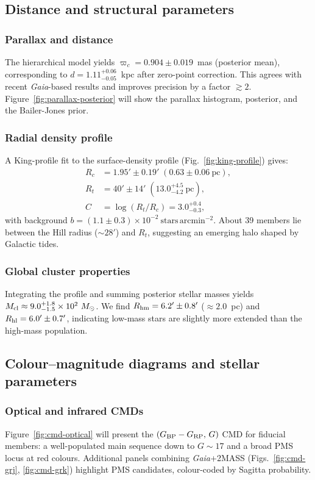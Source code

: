 \documentclass[../main.tex]{subfiles}
\begin{document}
\subsection{Distance and structural parameters}
\label{subsec:results-structure}

\subsubsection{Parallax and distance}
The hierarchical model yields $\varpi_c=0.904\pm0.019$~mas (posterior mean), corresponding to
$d=1.11^{+0.06}_{-0.05}$~kpc after zero-point correction. This agrees with recent \textit{Gaia}-based results and improves precision by a factor $\gtrsim2$. Figure~\ref{fig:parallax-posterior} will show the parallax histogram, posterior, and the Bailer-Jones prior.

\subsubsection{Radial density profile}
A King-profile fit to the surface-density profile (Fig.~\ref{fig:king-profile}) gives:
\begin{align*}
  R_c &= 1.95'\pm0.19' \;(0.63\pm0.06~\mathrm{pc}),\\
  R_t &= 40'\pm14' \;(13.0^{+4.5}_{-4.2}~\mathrm{pc}),\\
  C   &= \log(R_t/R_c)=3.0^{+0.4}_{-0.3},
\end{align*}
with background $b=(1.1\pm0.3)\times10^{-2}\ \mathrm{stars\,arcmin^{-2}}$.
About 39 members lie between the Hill radius ($\sim28'$) and $R_t$, suggesting an emerging halo shaped by Galactic tides.

\subsubsection{Global cluster properties}
Integrating the profile and summing posterior stellar masses yields
$M_{\rm cl}\approx 9.0^{+1.8}_{-1.5}\times10^2~M_\odot$.
We find $R_{\rm hm}=6.2'\pm0.8'$ ($\approx2.0$~pc) and
$R_{\rm hl}=6.0'\pm0.7'$, indicating low-mass stars are slightly more extended than the high-mass population.

\subsection{Colour--magnitude diagrams and stellar parameters}
\label{subsec:results-cmd}

\subsubsection{Optical and infrared CMDs}
Figure~\ref{fig:cmd-optical} will present the $(G_{\rm BP}-G_{\rm RP},\,G)$ CMD for fiducial members: a well-populated main sequence down to $G\sim17$ and a broad PMS locus at red colours. Additional panels combining \textit{Gaia}+2MASS (Figs.~\ref{fig:cmd-grj}, \ref{fig:cmd-grk}) highlight PMS candidates, colour-coded by Sagitta probability.
\end{document}
